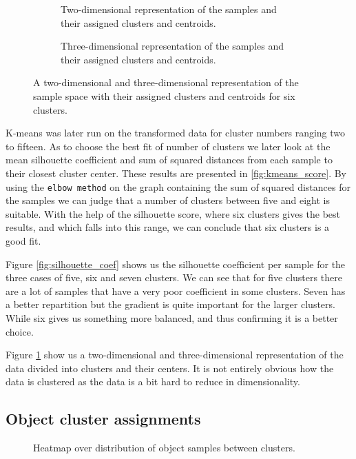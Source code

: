 \begin{figure}
	\begin{subfigure}[b]{\textwidth}
		
		\caption{Two-dimensional representation of the samples and their assigned clusters and centroids.}
	\end{subfigure}
	\begin{subfigure}[b]{\textwidth}
		
		\caption{Three-dimensional representation of the samples and their assigned clusters and centroids.}
	\end{subfigure}
	\caption{A two-dimensional and three-dimensional representation of the sample space with their assigned clusters and centroids for six clusters.}
	\label{fig:clusters}
\end{figure}

K-means was later run on the transformed data for cluster numbers ranging two to fifteen. As to choose the best fit of number of clusters we later look at the mean silhouette coefficient and sum of squared distances from each sample to their closest cluster center. These results are presented in \ref{fig:kmeans_score}. By using the \texttt{elbow method} on the graph containing the sum of squared distances for the samples we can judge that a number of clusters between five and eight is suitable. With the help of the silhouette score, where six clusters gives the best results, and which falls into this range, we can conclude that six clusters is a good fit.

Figure \ref{fig:silhouette_coef} shows us the silhouette coefficient per sample for the three cases of five, six and seven clusters. We can see that for five clusters there are a lot of samples that have a very poor coefficient in some clusters. Seven has a better repartition but the gradient is quite important for the larger clusters. While six gives us something more balanced, and thus confirming it is a better choice.

Figure \ref{fig:clusters} show us a two-dimensional and three-dimensional representation of the data divided into clusters and their centers. It is not entirely obvious how the data is clustered as the data is a bit hard to reduce in dimensionality.


\subsection{Object cluster assignments}

\begin{figure}
	
	\caption{Heatmap over distribution of object samples between clusters.}
	\label{fig:obj_sample_heatmap}
\end{figure}

